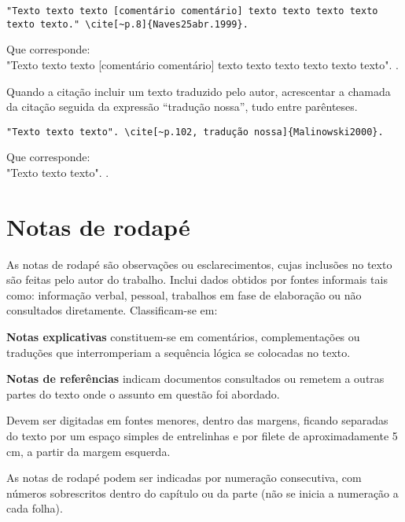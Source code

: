 \begin{alineas}
\begin{verbatim}
"Texto texto texto [comentário comentário] texto texto texto texto 
texto texto." \cite[~p.8]{Naves25abr.1999}.
\end{verbatim}
Que corresponde:\\
"Texto texto texto [comentário comentário] texto texto texto texto texto texto".  \cite[~p.8]{Naves25abr.1999}.\\
\item
Quando a citação incluir um texto traduzido pelo autor, acrescentar a chamada da citação seguida da expressão “tradução nossa”, tudo entre parênteses.
\begin{verbatim}
"Texto texto texto". \cite[~p.102, tradução nossa]{Malinowski2000}.
\end{verbatim}
Que corresponde:\\
"Texto texto texto". \cite[~p.102, tradução nossa]{Malinowski2000}.\\
\end{alineas}

\section{Notas de rodapé}
As notas de rodapé são observações ou esclarecimentos, cujas inclusões no texto são feitas pelo autor do trabalho. Inclui dados obtidos por fontes informais tais como: informação verbal, pessoal, trabalhos em fase de elaboração ou não consultados diretamente.
Classificam-se em:\\
\begin{alineas}
\item
\textbf{Notas explicativas} constituem-se em comentários, complementações ou traduções que interromperiam a sequência lógica se colocadas no texto.
\item
\textbf{Notas de referências} indicam documentos consultados ou remetem a outras partes do texto onde o assunto em questão foi abordado. \\
\end{alineas}

Devem ser digitadas em fontes menores, dentro das margens, ficando separadas do texto por um espaço simples de entrelinhas e por filete de aproximadamente 5 cm, a partir da margem esquerda.

As notas de rodapé podem ser indicadas por numeração consecutiva, com números sobrescritos dentro do capítulo ou da parte (não se inicia a numeração a cada folha).\\

